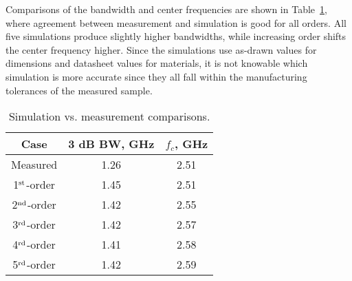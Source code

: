 \documentclass[titlepage]{article}
\renewcommand\_{\textunderscore\linebreak[1]}
\begin{document}
Comparisons of the bandwidth and center frequencies are shown in Table~\ref{table:microstrip_filter_comparisons}, where agreement between measurement and simulation is good for all orders.  All five simulations produce slightly higher bandwidths, while increasing order shifts the center frequency higher.  Since the simulations use as-drawn values for dimensions and datasheet values for materials, it is not knowable which simulation is more accurate since they all fall within the manufacturing tolerances of the measured sample.
\begin{table}
\caption{Simulation vs. measurement comparisons.}
\begin{center}
\begin{tabular}{|c|c|c|}
\hline
Case & 3 dB BW, GHz & $f_c$, GHz \\
\hline
Measured \cite{Weng} & 1.26 & 2.51 \\
1$^{\textnormal{st}}$-order & 1.45 & 2.51 \\
2$^{\textnormal{nd}}$-order & 1.42 & 2.55 \\
3$^{\textnormal{rd}}$-order & 1.42 & 2.57 \\
4$^{\textnormal{rd}}$-order & 1.41 & 2.58 \\
5$^{\textnormal{rd}}$-order & 1.42 & 2.59 \\
\hline
\end{tabular}
\end{center}
\label{table:microstrip_filter_comparisons}
\end{table}
\end{document}
